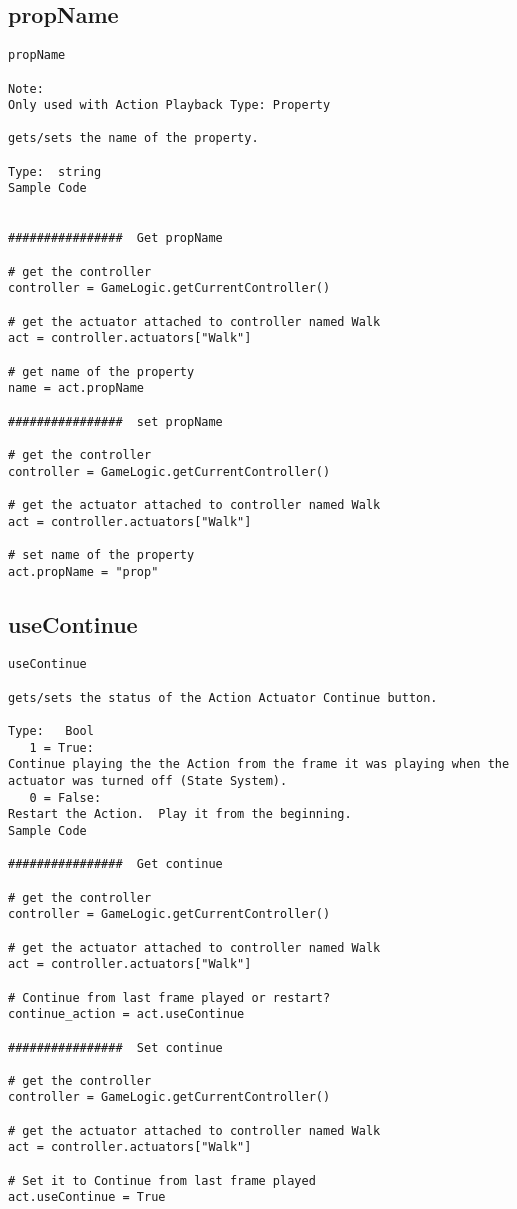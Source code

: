 \subsection{propName}
\begin{verbatim}
propName

Note:
Only used with Action Playback Type: Property

gets/sets the name of the property.  

Type:  string
Sample Code


################  Get propName

# get the controller
controller = GameLogic.getCurrentController()

# get the actuator attached to controller named Walk
act = controller.actuators["Walk"]

# get name of the property
name = act.propName

################  set propName

# get the controller
controller = GameLogic.getCurrentController()

# get the actuator attached to controller named Walk
act = controller.actuators["Walk"]

# set name of the property
act.propName = "prop"
\end{verbatim}


\subsection{useContinue}
\begin{verbatim}
useContinue

gets/sets the status of the Action Actuator Continue button.

Type:   Bool
   1 = True:
Continue playing the the Action from the frame it was playing when the actuator was turned off (State System). 
   0 = False:
Restart the Action.  Play it from the beginning.
Sample Code

################  Get continue

# get the controller
controller = GameLogic.getCurrentController()

# get the actuator attached to controller named Walk
act = controller.actuators["Walk"]

# Continue from last frame played or restart?
continue_action = act.useContinue

################  Set continue

# get the controller
controller = GameLogic.getCurrentController()

# get the actuator attached to controller named Walk
act = controller.actuators["Walk"]

# Set it to Continue from last frame played
act.useContinue = True
\end{verbatim}

